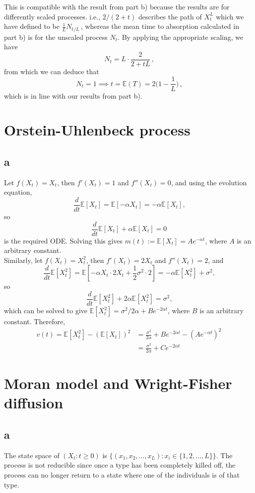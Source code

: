 \documentclass[12pt, twoside, a4paper]{article}
\begin{document}
This is compatible with the result from part b) because the results are for differently scaled processes. i.e., $2/(2+t)$ describes the path of $X_t^L$ which we have defined to be $\frac{1}{L} N_{t/L} \, $, whereas the mean time to absorption calculated in part b) is for the unscaled process $N_t$. By applying the appropriate scaling, we have 
\[
N_t = L \cdot \frac{2}{2+tL} \, \text{,}
\]
from which we can deduce that 
\[N_t = 1 \implies t = \mathbb{E} (T) = 2 \bigg(1 - \frac{1}{L} \bigg) \, \text{,}
\]
which is in line with our results from part b).
\section{Orstein-Uhlenbeck process}
\subsection*{a}
Let $f(X_t) = X_t$, then $f'(X_t) = 1$ and $f''(X_t) = 0$, and using the evolution equation, 
\[
\frac{d}{dt} \mathbb{E} [X_t] = \mathbb{E} [ - \alpha X_t ] = - \alpha \mathbb{E} [X_t] \text{,}
\]
so
\[
\frac{d}{dt} \mathbb{E} [X_t] + \alpha \mathbb{E} [X_t] = 0
\]
is the required ODE. 
Solving this gives $m(t) := \mathbb{E} [X_t] = Ae^{- \alpha t}$, where $A$ is an arbitrary constant.\\
Similarly, let $f(X_t) = X_t^2$, then $f'(X_t) = 2X_t$ and $f''(X_t) = 2$, and 
\[
\frac{d}{dt} \mathbb{E} [X_t^2] = \mathbb{E} [ - \alpha X_t \cdot 2X_t + \frac{1}{2} \sigma ^2 \cdot 2 ] = - \alpha \mathbb{E} [X_t^2] + \sigma ^2 \text{,}
\]
so
\[
\frac{d}{dt} \mathbb{E} [X_t^2] + 2 \alpha \mathbb{E} [X_t^2] = \sigma ^2 \text{,}
\]
which can be solved to give $\mathbb{E} [X_t^2] = \sigma ^2/2 \alpha + Be^{-2 \alpha t}$, where $B$ is an arbitrary constant. Therefore, 
\begin{align*}
v(t) = \mathbb{E} [X_t^2] - (\mathbb{E} [X_t])^2 &= \frac{\sigma ^2}{2 \alpha} + Be^{-2 \alpha t} - (Ae^{- \alpha t})^2\\
&= \frac{\sigma ^2}{2 \alpha} + Ce^{-2 \alpha t}
\end{align*}

\section{Moran model and Wright-Fisher diffusion}
\subsection*{a}
The state space of $(X_t : t \geq 0)$ is $\{ (x_1, x_2, \dots, x_L) : x_i \in \{ 1, 2, \dots, L\}\}$. The process is not reducible since once a type has been completely killed off, the process can no longer return to a state where one of the individuals is of that type.
\end{document}
